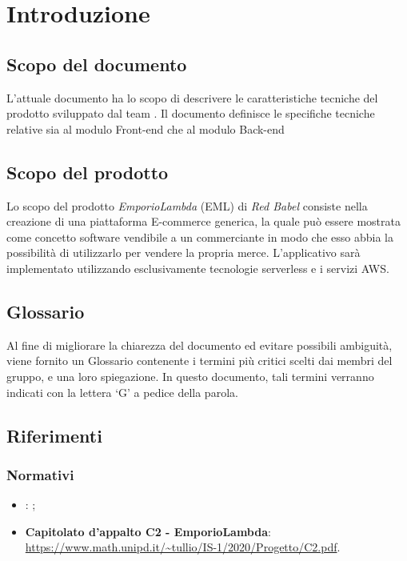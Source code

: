 \section{Introduzione}
\subsection{Scopo del documento}
L'attuale documento ha lo scopo di descrivere le caratteristiche tecniche del prodotto \nameproject{} sviluppato dal team \Omicron. Il documento definisce le specifiche tecniche relative sia al modulo Front-end che al modulo Back-end
\subsection{Scopo del prodotto}
Lo scopo del prodotto \textit{EmporioLambda} (EML) di \textit{Red Babel} consiste nella creazione di una piattaforma E-commerce generica, la quale può essere mostrata come concetto software vendibile a un commerciante in modo che esso abbia la possibilità di utilizzarlo per vendere la propria merce. L'applicativo sarà implementato utilizzando esclusivamente tecnologie serverless e i servizi AWS.
\subsection{Glossario}
Al fine di migliorare la chiarezza del documento ed evitare possibili ambiguità, viene fornito un Glossario contenente i termini più critici scelti dai membri del gruppo, e una loro spiegazione. In questo documento, tali termini verranno indicati con la lettera `G' a pedice della parola.
\subsection{Riferimenti}
\subsubsection{Normativi}
\begin{itemize}
	\item \textbf{\NdP}: ;
	\item \textbf{Capitolato d'appalto C2 - EmporioLambda}: \\ \url{https://www.math.unipd.it/~tullio/IS-1/2020/Progetto/C2.pdf}.
\end{itemize}

